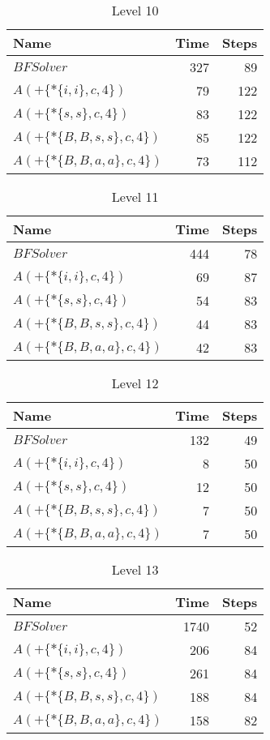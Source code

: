 \begin{table} \centering \begin{tabular}{lrr}\toprule \textbf{ Name }
    & \textbf{ Time } & \textbf{ Steps }\\\midrule
    $BFSolver$ & 327 & 89 \\
    $A(+\{*\{i,i\},c,4\})$ & 79 & 122 \\
    $A(+\{*\{s,s\},c,4\})$ & 83 & 122 \\
    $A(+\{*\{B,B,s,s\},c,4\})$ & 85 & 122 \\
    $A(+\{*\{B,B,a,a\},c,4\})$ & 73 & 112 \\
    \bottomrule \end{tabular} \caption{Level 10}
  \label{tab:level_10} \end{table}

\begin{table} \centering \begin{tabular}{lrr}\toprule \textbf{ Name }
    & \textbf{ Time } & \textbf{ Steps }\\\midrule
    $BFSolver$ & 444 & 78 \\
    $A(+\{*\{i,i\},c,4\})$ & 69 & 87 \\
    $A(+\{*\{s,s\},c,4\})$ & 54 & 83 \\
    $A(+\{*\{B,B,s,s\},c,4\})$ & 44 & 83 \\
    $A(+\{*\{B,B,a,a\},c,4\})$ & 42 & 83 \\
    \bottomrule \end{tabular} \caption{Level 11}
  \label{tab:level_11} \end{table}

\begin{table} \centering \begin{tabular}{lrr}\toprule \textbf{ Name }
    & \textbf{ Time } & \textbf{ Steps }\\\midrule
    $BFSolver$ & 132 & 49 \\
    $A(+\{*\{i,i\},c,4\})$ & 8 & 50 \\
    $A(+\{*\{s,s\},c,4\})$ & 12 & 50 \\
    $A(+\{*\{B,B,s,s\},c,4\})$ & 7 & 50 \\
    $A(+\{*\{B,B,a,a\},c,4\})$ & 7 & 50 \\
    \bottomrule \end{tabular} \caption{Level 12}
  \label{tab:level_12} \end{table}

\begin{table} \centering \begin{tabular}{lrr}\toprule \textbf{ Name }
    & \textbf{ Time } & \textbf{ Steps }\\\midrule
    $BFSolver$ & 1740 & 52 \\
    $A(+\{*\{i,i\},c,4\})$ & 206 & 84 \\
    $A(+\{*\{s,s\},c,4\})$ & 261 & 84 \\
    $A(+\{*\{B,B,s,s\},c,4\})$ & 188 & 84 \\
    $A(+\{*\{B,B,a,a\},c,4\})$ & 158 & 82 \\
    \bottomrule \end{tabular} \caption{Level 13}
  \label{tab:level_13} \end{table}

